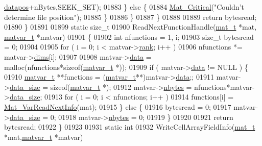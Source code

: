 \begin{DoxyCode}
{{{{{{{{{{{{{{{{      \hyperlink{structmatvar__internal_afd3bfaab126a160bd6855563e1ea0a7e}{datapos}+nBytes,SEEK\_SET);
01883             \} \textcolor{keywordflow}{else} \{
01884                 \hyperlink{group__mat__util_gaf51f2bfbb5580f575e4dd79757e2b80c}{Mat\_Critical}(\textcolor{stringliteral}{"Couldn't determine file position"});
01885             \}
01886         \}
01887     \}
01888 
01889     \textcolor{keywordflow}{return} bytesread;
01890 \}
01891 
01899 \textcolor{keyword}{static} \textcolor{keywordtype}{size\_t}
01900 ReadNextFunctionHandle(\hyperlink{struct__mat__t}{mat\_t} *mat, \hyperlink{group___m_a_t_structmatvar__t}{matvar\_t} *matvar)
01901 \{
01902     \textcolor{keywordtype}{int} nfunctions = 1, i;
01903     \textcolor{keywordtype}{size\_t} bytesread = 0;
01904 
01905     \textcolor{keywordflow}{for} ( i = 0; i < matvar->\hyperlink{group___m_a_t_a84ba70c96ded13cc555fa75b768d9921}{rank}; i++ )
01906         nfunctions *= matvar->\hyperlink{group___m_a_t_a8e01234e1c862ce3472bb37f5a09b92c}{dims}[i];
01907 
01908     matvar->\hyperlink{group___m_a_t_a5672978efa230bbdecdf38ede781f7fa}{data} = malloc(nfunctions*\textcolor{keyword}{sizeof}(\hyperlink{group___m_a_t_structmatvar__t}{matvar\_t} *));
01909     \textcolor{keywordflow}{if} ( matvar->\hyperlink{group___m_a_t_a5672978efa230bbdecdf38ede781f7fa}{data} != NULL ) \{
01910         \hyperlink{group___m_a_t_structmatvar__t}{matvar\_t} **functions = (\hyperlink{group___m_a_t_structmatvar__t}{matvar\_t}**)matvar->\hyperlink{group___m_a_t_a5672978efa230bbdecdf38ede781f7fa}{data};;
01911         matvar->\hyperlink{group___m_a_t_a9ad1c82e2b568da617e12dc73a26e1f9}{data\_size} = \textcolor{keyword}{sizeof}(\hyperlink{group___m_a_t_structmatvar__t}{matvar\_t} *);
01912         matvar->\hyperlink{group___m_a_t_abf1c844540503be2df9bb3db93cfe307}{nbytes}    = nfunctions*matvar->\hyperlink{group___m_a_t_a9ad1c82e2b568da617e12dc73a26e1f9}{data\_size};
01913         \textcolor{keywordflow}{for} ( i = 0; i < nfunctions; i++ )
01914             functions[i] = \hyperlink{group___m_a_t_ga72dd99330507b17177e22f9ed3bea5e6}{Mat\_VarReadNextInfo}(mat);
01915     \} \textcolor{keywordflow}{else} \{
01916         bytesread = 0;
01917         matvar->\hyperlink{group___m_a_t_a9ad1c82e2b568da617e12dc73a26e1f9}{data\_size} = 0;
01918         matvar->\hyperlink{group___m_a_t_abf1c844540503be2df9bb3db93cfe307}{nbytes}    = 0;
01919     \}
01920 
01921     \textcolor{keywordflow}{return} bytesread;
01922 \}
01923 
01931 \textcolor{keyword}{static} \textcolor{keywordtype}{int}
01932 WriteCellArrayFieldInfo(\hyperlink{struct__mat__t}{mat\_t} *mat,\hyperlink{group___m_a_t_structmatvar__t}{matvar\_t} *matvar)
}}}}}}}}}}}}}}}}
\end{DoxyCode}
